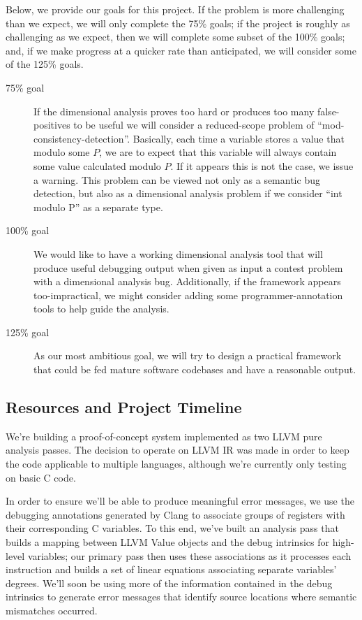\documentclass[12pt]{article}
\begin{document}
Below, we provide our goals for this project. If the problem is more challenging than we expect, we will only complete the 75\% goals; if the project is roughly as challenging as we expect, then we will complete some subset of the 100\% goals; and, if we make progress at a quicker rate than anticipated, we will consider some of the 125\% goals.
\begin{description}
\item [75\% goal] If the dimensional analysis proves too hard or produces too many false-positives to be useful we will consider a reduced-scope problem of ``mod-consistency-detection''. Basically, each time a variable stores a value that modulo some $P$, we are to expect that this variable will always contain some value calculated modulo $P$. If it appears this is not the case, we issue a warning. This problem can be viewed not only as a semantic bug detection, but also as a dimensional analysis problem if we consider ``int modulo P'' as a separate type.

\item [100\% goal] We would like to have a working dimensional analysis tool that will produce useful debugging output when given as input a contest problem with a dimensional analysis bug. Additionally, if the framework appears too-impractical, we might consider adding some programmer-annotation tools to help guide the analysis. 

\item [125\% goal] As our most ambitious goal, we will try to design a practical framework that could be fed mature software codebases and have a reasonable output.
\end{description}

\subsection{Resources and Project Timeline}

We're building a proof-of-concept system implemented as two LLVM pure analysis passes.
The decision to operate on LLVM IR was made in order to keep the code applicable to multiple languages, although we're currently only testing on basic C code.

In order to ensure we'll be able to produce meaningful error messages, we use the debugging annotations generated by Clang to associate groups of registers with their corresponding C variables.
To this end, we've built an analysis pass that builds a mapping between LLVM Value objects and the debug intrinsics for high-level variables; our primary pass then uses these associations as it processes each instruction and builds a set of linear equations associating separate variables' degrees.
We'll soon be using more of the information contained in the debug intrinsics to generate error messages that identify source locations where semantic mismatches occurred.
\end{document}
